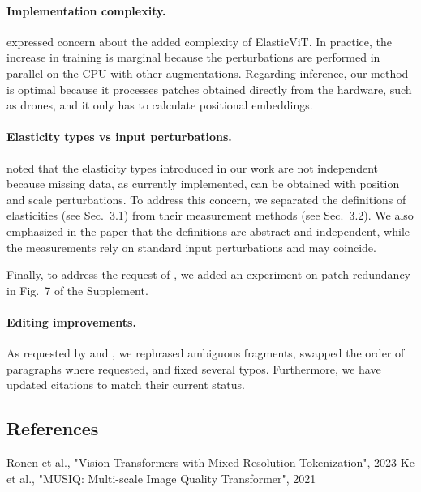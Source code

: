 \documentclass[10pt,twocolumn,letterpaper]{article}
\begin{document}
\vspace{-0.05in}
\paragraph{Implementation complexity.} \Rtwo{} expressed concern about the added complexity of ElasticViT. In practice, the increase in training is marginal because the perturbations are performed in parallel on the CPU with other augmentations. Regarding inference, our method is optimal because it processes patches obtained directly from the hardware, such as drones, and it only has to calculate positional embeddings.

\vspace{-0.05in}
\paragraph{Elasticity types vs input perturbations.}
\Rone{} noted that the elasticity types introduced in our work are not independent because missing data, as currently implemented, can be obtained with position and scale perturbations. To address this concern, we separated the definitions of elasticities (see Sec.~3.1) from their measurement methods (see Sec.~3.2). We also emphasized in the paper that the definitions are abstract and independent, while the measurements rely on standard input perturbations and may coincide.

Finally, to address the request of \Rone{}, we added an experiment on patch redundancy in Fig.~7 of the Supplement.


\vspace{-0.05in}
\paragraph{Editing improvements.}
As requested by \Rone{} and \Rthree{}, we rephrased ambiguous fragments, swapped the order of paragraphs where requested, and fixed several typos. Furthermore, we have updated citations to match their current status.


{\small
\begin{flushleft}
\section*{References}
\noindent [1] Ronen et al., "Vision Transformers with Mixed-Resolution Tokenization", 2023 \break
[2] Ke et al., "MUSIQ: Multi-scale Image Quality Transformer", 2021
\end{flushleft}
% 
% 
}
\end{document}
